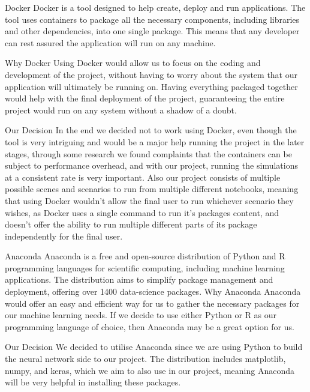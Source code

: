 

Docker
Docker is a tool designed to help create, deploy and run applications. The tool uses containers to package all the necessary components, including libraries and other dependencies, into one single package. This means that any developer can rest assured the application will run on any machine.

Why Docker
Using Docker would allow us to focus on the coding and development of the project, without having to worry about the system that our application will ultimately be running on. Having everything packaged together would help with the final deployment of the project, guaranteeing the entire project would run on any system without a shadow of a doubt.

Our Decision
In the end we decided not to work using Docker, even though the tool is very intriguing and would be a major help running the project in the later stages, through some research we found complaints that the containers can be subject to performance overhead, and with our project, running the simulations at a consistent rate is very important. Also our project consists of multiple possible scenes and scenarios to run from multiple different notebooks, meaning that using Docker wouldn’t allow the final user to run whichever scenario they wishes, as Docker uses a single command to run it’s packages content, and doesn’t offer the ability to run multiple different parts of its package independently for the final user.


Anaconda
Anaconda is a free and open-source distribution of Python and R programming languages for scientific computing, including machine learning applications. The distribution aims to simplify package management and deployment, offering over 1400 data-science packages.
Why Anaconda
Anaconda would offer an easy and efficient way for us to gather the necessary packages for our machine learning needs. If we decide to use either Python or R as our programming language of choice, then Anaconda may be a great option for us.

Our Decision
We decided to utilise Anaconda since we are using Python to build the neural network side to our project. The distribution includes matplotlib, numpy, and keras, which we aim to also use in our project, meaning Anaconda will be very helpful in installing these packages.



